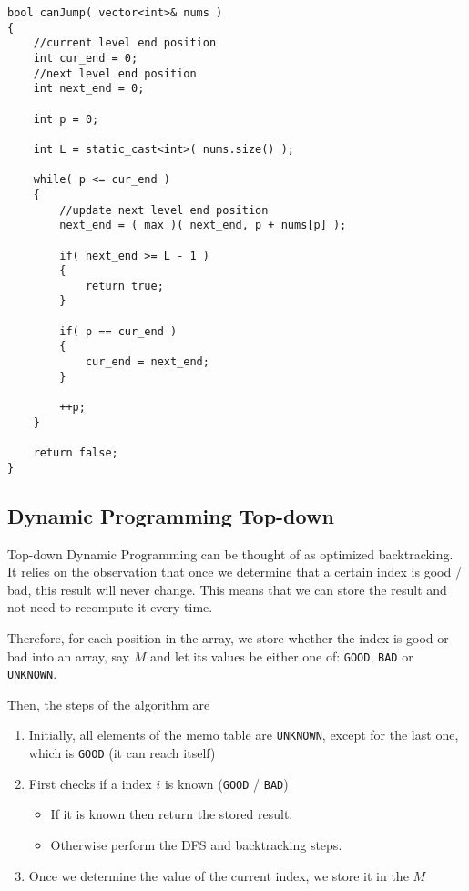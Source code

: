 \setcounter{lstlisting}{0}
\begin{lstlisting}[style=customc, caption={Graphic Approach}]
bool canJump( vector<int>& nums )
{
    //current level end position
    int cur_end = 0;
    //next level end position
    int next_end = 0;

    int p = 0;

    int L = static_cast<int>( nums.size() );

    while( p <= cur_end )
    {
        //update next level end position
        next_end = ( max )( next_end, p + nums[p] );

        if( next_end >= L - 1 )
        {
            return true;
        }

        if( p == cur_end )
        {
            cur_end = next_end;
        }

        ++p;
    }

    return false;
}
\end{lstlisting}

\subsection{Dynamic Programming Top-down}
Top-down Dynamic Programming can be thought of as optimized backtracking. It relies on the observation that once we determine that a certain index is good / bad, this result will never change. This means that we can store the result and not need to recompute it every time.

Therefore, for each position in the array, we store whether the index is good or bad into an array, say $M$ and let its values be either one of: \texttt{GOOD}, \texttt{BAD} or \texttt{UNKNOWN}.

Then, the steps of the algorithm are 
\begin{enumerate}
\item Initially, all elements of the memo table are \texttt{UNKNOWN}, except for the last one, which is \texttt{GOOD} (it can reach itself)
\item First checks if a index $i$ is known (\texttt{GOOD} / \texttt{BAD})
\begin{itemize}
\item If it is known then return the stored result.
\item Otherwise perform the DFS and backtracking steps.
\end{itemize}
\item Once we determine the value of the current index, we store it in the $M$
\end{enumerate}

